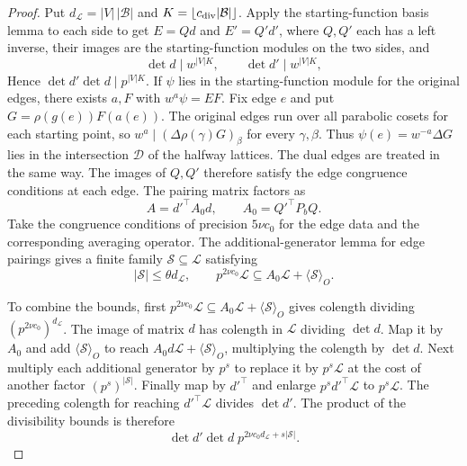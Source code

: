 \begin{proof}
Put $d_{\mathcal L}=|V|\,|\mathcal B|$ and $K=\lfloor c_{\rm div}|\mathcal B|\rfloor$. Apply the starting-function basis lemma to each side to get $E=Qd$ and $E'=Q'd'$, where $Q,Q'$ each has a left inverse, their images are the starting-function modules on the two sides, and
\[
 \det d\mid w^{|V|K},\qquad
 \det d'\mid w^{|V|K},
\]
Hence $\det d'\det d\mid p^{|V|K}$. If $\psi$ lies in the starting-function module for the original edges, there exists $a,F$ with $w^a\psi=EF$. Fix edge $e$ and put $G=\rho(g(e))F(a(e))$. The original edges run over all parabolic cosets for each starting point, so $w^a\mid(\Delta\rho(\gamma)G)_\beta$ for every $\gamma,\beta$. Thus $\psi(e)=w^{-a}\Delta G$ lies in the intersection $\mathcal D$ of the halfway lattices. The dual edges are treated in the same way. The images of $Q,Q'$ therefore satisfy the edge congruence conditions at each edge. The pairing matrix factors as
\[
 A=d'^\top A_0d,\qquad A_0=Q'^\top P_bQ .
\]
Take the congruence conditions of precision $5\nu c_0$ for the edge data and the corresponding averaging operator. The additional-generator lemma for edge pairings gives a finite family $\mathcal S\subseteq\mathcal L$ satisfying
\[
 |\mathcal S|\le\theta d_{\mathcal L},\qquad
 p^{2\nu c_0}\mathcal L\subseteq A_0\mathcal L+\langle\mathcal S\rangle_O .
\]

To combine the bounds, first $p^{2\nu c_0}\mathcal L\subseteq A_0\mathcal L+\langle\mathcal S\rangle_O$ gives colength dividing $(p^{2\nu c_0})^{d_{\mathcal L}}$. The image of matrix $d$ has colength in $\mathcal L$ dividing $\det d$. Map it by $A_0$ and add $\langle\mathcal S\rangle_O$ to reach $A_0d\mathcal L+\langle\mathcal S\rangle_O$, multiplying the colength by $\det d$. Next multiply each additional generator by $p^s$ to replace it by $p^s\mathcal L$ at the cost of another factor $(p^s)^{|\mathcal S|}$. Finally map by $d'^\top$ and enlarge $p^sd'^\top\mathcal L$ to $p^s\mathcal L$. The preceding colength for reaching $d'^\top\mathcal L$ divides $\det d'$. The product of the divisibility bounds is therefore
\[
 \det d'\det d\;p^{2\nu c_0 d_{\mathcal L}+s|\mathcal S|}.
\]


\end{proof}
